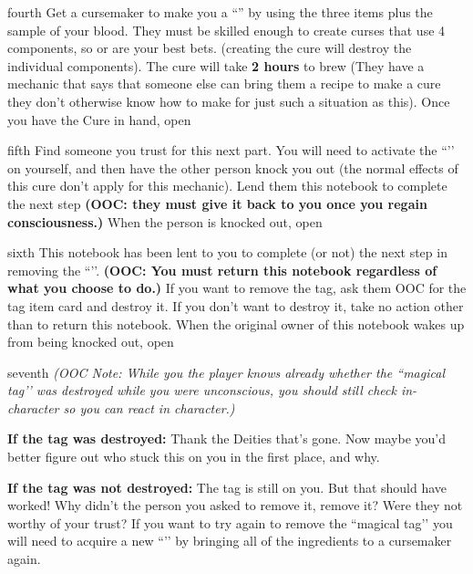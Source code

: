 \documentclass[notebook]{GL2020} %
\begin{document}
\begin{page}{fourth}
Get a cursemaker to make you a ``\iPanacea{}'' by using the three items plus the sample of your blood. They must be skilled enough to create curses that use 4 components, so \cPrince{} or \cCurse{} are your best bets. (creating the cure will destroy the individual components). The cure will take \textbf{2 hours} to brew (They have a mechanic that says that someone else can bring them a recipe to make a cure they don’t otherwise know how to make for just such a situation as this). Once you have the Cure in hand, open 
\end{page}

\begin{page}{fifth}
Find someone you trust for this next part. You will need to activate the ``\iPanacea{}’’ on yourself, and then have the other person knock you out (the normal effects of this cure don't apply for this mechanic).  Lend them this notebook to complete the next step \textbf{(OOC: they must give it back to you once you regain consciousness.)} When the person is knocked out, open 
\end{page}

\begin{page}{sixth}
This notebook has been lent to you to complete (or not) the next step in removing the ``\iMagicTag{}’’. \textbf{(OOC: You must return this notebook regardless of what you choose to do.)} If you want to remove the tag, ask them OOC for the tag item card and destroy it. If you don’t want to destroy it, take no action other than to return this notebook. When the original owner of this notebook wakes up from being knocked out, open 
\end{page}

\begin{page}{seventh}
\emph{(OOC Note: While you the player knows already whether the ``magical tag’’ was destroyed while you were unconscious, you should still check in-character so you can react in character.)}

\textbf{If the tag was destroyed:} Thank the Deities that’s gone. Now maybe you’d better figure out who stuck this on you in the first place, and why.

\textbf{If the tag was not destroyed:} The tag is still on you. But that should have worked! Why didn’t the person you asked to remove it, remove it? Were they not worthy of your trust? If you want to try again to remove the ``magical tag’’ you will need to acquire a new ``\iPanacea{}’’ by bringing all of the ingredients to a cursemaker again.

\end{page}

\endnotebook
\end{document}
